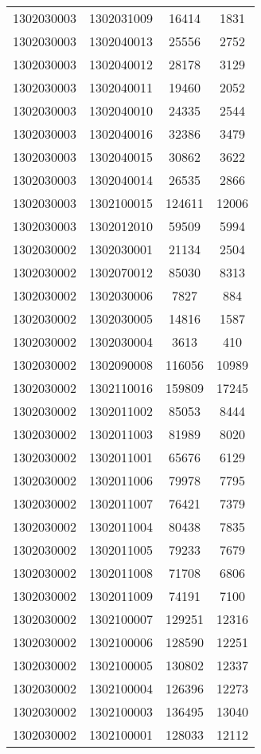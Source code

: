 \begin{longtable}{llcc}
1302030003 & 1302031009 & 16414 & 1831\\
1302030003 & 1302040013 & 25556 & 2752\\
1302030003 & 1302040012 & 28178 & 3129\\
1302030003 & 1302040011 & 19460 & 2052\\
1302030003 & 1302040010 & 24335 & 2544\\
1302030003 & 1302040016 & 32386 & 3479\\
1302030003 & 1302040015 & 30862 & 3622\\
1302030003 & 1302040014 & 26535 & 2866\\
1302030003 & 1302100015 & 124611 & 12006\\
1302030003 & 1302012010 & 59509 & 5994\\
1302030002 & 1302030001 & 21134 & 2504\\
1302030002 & 1302070012 & 85030 & 8313\\
1302030002 & 1302030006 & 7827 & 884\\
1302030002 & 1302030005 & 14816 & 1587\\
1302030002 & 1302030004 & 3613 & 410\\
1302030002 & 1302090008 & 116056 & 10989\\
1302030002 & 1302110016 & 159809 & 17245\\
1302030002 & 1302011002 & 85053 & 8444\\
1302030002 & 1302011003 & 81989 & 8020\\
1302030002 & 1302011001 & 65676 & 6129\\
1302030002 & 1302011006 & 79978 & 7795\\
1302030002 & 1302011007 & 76421 & 7379\\
1302030002 & 1302011004 & 80438 & 7835\\
1302030002 & 1302011005 & 79233 & 7679\\
1302030002 & 1302011008 & 71708 & 6806\\
1302030002 & 1302011009 & 74191 & 7100\\
1302030002 & 1302100007 & 129251 & 12316\\
1302030002 & 1302100006 & 128590 & 12251\\
1302030002 & 1302100005 & 130802 & 12337\\
1302030002 & 1302100004 & 126396 & 12273\\
1302030002 & 1302100003 & 136495 & 13040\\
1302030002 & 1302100001 & 128033 & 12112\\

\end{longtable}

